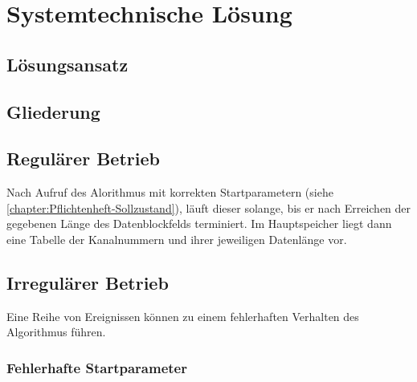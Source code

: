 \chapter{Systemtechnische Lösung}
\label{chapter:Pflichtenheft-SystemtechnischeLoesung}

\section{Lösungsansatz}
\label{section:Pflichtenheft-SystemtechnischeLoesung-Loesungsansatz}



\section{Gliederung}
\label{section:Pflichtenheft-SystemtechnischeLoesung-Gliederung}



\section{Regulärer Betrieb}
\label{section:Pflichtenheft-SystemtechnischeLoesung-regulaer}

Nach Aufruf des Alorithmus mit korrekten Startparametern (siehe \autoref{chapter:Pflichtenheft-Sollzustand}), läuft dieser solange, bis er nach Erreichen der gegebenen Länge des Datenblockfelds terminiert. Im Hauptspeicher liegt dann eine Tabelle der Kanalnummern und ihrer jeweiligen Datenlänge vor.


\section{Irregulärer Betrieb}
\label{section:Pflichtenheft-SystemtechnischeLoesung-irregulaer}

Eine Reihe von Ereignissen können zu einem fehlerhaften Verhalten des Algorithmus führen.

\subsection{Fehlerhafte Startparameter}
\label{subsection:Pflichtenheft-SystemtechnischeLoesung-irregulaer-startparameter}

